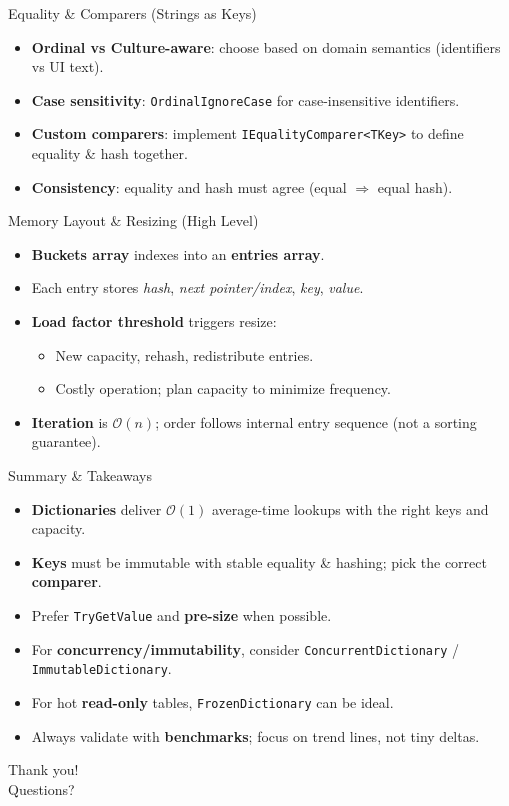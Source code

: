 \documentclass[aspectratio=169]{beamer}
\newcommand{\bigO}[1]{$\mathcal{O}(#1)$}
\newcommand{\code}[1]{\texttt{#1}}
\begin{document}
\begin{frame}{Equality \& Comparers (Strings as Keys)}
  \begin{itemize}
    \item \textbf{Ordinal vs Culture-aware}: choose based on domain semantics (identifiers vs UI text).
    \item \textbf{Case sensitivity}: \code{OrdinalIgnoreCase} for case-insensitive identifiers.
    \item \textbf{Custom comparers}: implement \code{IEqualityComparer<TKey>} to define equality \& hash together.
    \item \textbf{Consistency}: equality and hash must agree (equal $\Rightarrow$ equal hash).
  \end{itemize}
\end{frame}

\begin{frame}{Memory Layout \& Resizing (High Level)}
  \begin{itemize}
    \item \textbf{Buckets array} indexes into an \textbf{entries array}.
    \item Each entry stores \emph{hash}, \emph{next pointer/index}, \emph{key}, \emph{value}.
    \item \textbf{Load factor threshold} triggers resize:
      \begin{itemize}
        \item New capacity, rehash, redistribute entries.
        \item Costly operation; plan capacity to minimize frequency.
      \end{itemize}
    \item \textbf{Iteration} is \bigO{n}; order follows internal entry sequence (not a sorting guarantee).
  \end{itemize}
\end{frame}

\begin{frame}{Summary \& Takeaways}
  \begin{itemize}
    \item \textbf{Dictionaries} deliver \bigO{1} average-time lookups with the right keys and capacity.
    \item \textbf{Keys} must be immutable with stable equality \& hashing; pick the correct \textbf{comparer}.
    \item Prefer \code{TryGetValue} and \textbf{pre-size} when possible.
    \item For \textbf{concurrency/immutability}, consider \code{ConcurrentDictionary} / \code{ImmutableDictionary}.
    \item For hot \textbf{read-only} tables, \code{FrozenDictionary} can be ideal.
    \item Always validate with \textbf{benchmarks}; focus on trend lines, not tiny deltas.
  \end{itemize}
\end{frame}

\begin{frame}[standout]
  Thank you! \\
  \vspace{2mm}
  Questions?
\end{frame}
\end{document}

